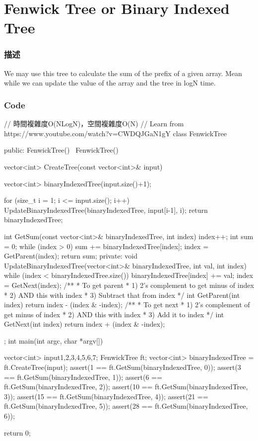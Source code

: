 \section{Fenwick Tree or Binary Indexed Tree} %
\label{sec:fenwick-tree-or-binary-indexed-tree}


\subsubsection{描述}
We may use this tree to calculate the sum of the prefix of a given array. Mean while we can update the value of the array and the tree in logN time.

\subsubsection{Code}
\begin{Code}
// 時間複雜度O(NLogN)，空間複雜度O(N)
// Learn from https://www.youtube.com/watch?v=CWDQJGaN1gY
class FenwickTree
{
public:
    FenwickTree() {}
    ~FenwickTree() {}

    vector<int> CreateTree(const vector<int>& input)
    {
        vector<int> binaryIndexedTree(input.size()+1);

        for (size_t i = 1; i <= input.size(); i++)
        {
            UpdateBinaryIndexedTree(binaryIndexedTree, input[i-1], i);
        }
        return binaryIndexedTree;
    }
    int GetSum(const vector<int>& binaryIndexedTree, int index)
    {
        index++;
        int sum = 0;
        while (index > 0)
        {
            sum += binaryIndexedTree[index];
            index = GetParent(index);
        }
        return sum;
    }
private:
    void UpdateBinaryIndexedTree(vector<int>& binaryIndexedTree, int val, int index)
    {
        while (index < binaryIndexedTree.size())
        {
            binaryIndexedTree[index] += val;
            index = GetNext(index);
        }
    }
    /**
     * To get parent
     * 1) 2's complement to get minus of index
     * 2) AND this with index
     * 3) Subtract that from index
     */
    int GetParent(int index)
    {
        return index - (index & -index);
    }
    /**
     * To get next
     * 1) 2's complement of get minus of index
     * 2) AND this with index
     * 3) Add it to index
     */
    int GetNext(int index)
    {
        return index + (index & -index);
    }
};
int main(int argc, char *argv[])
{
    vector<int> input{1,2,3,4,5,6,7};
    FenwickTree ft;
    vector<int> binaryIndexedTree = ft.CreateTree(input);
    assert(1 == ft.GetSum(binaryIndexedTree, 0));
    assert(3 == ft.GetSum(binaryIndexedTree, 1));
    assert(6 == ft.GetSum(binaryIndexedTree, 2));
    assert(10 == ft.GetSum(binaryIndexedTree, 3));
    assert(15 == ft.GetSum(binaryIndexedTree, 4));
    assert(21 == ft.GetSum(binaryIndexedTree, 5));
    assert(28 == ft.GetSum(binaryIndexedTree, 6));

    return 0;
}
\end{Code}

